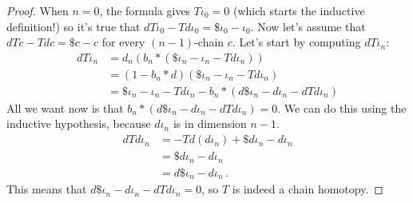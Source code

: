 \begin{proof}
When $n=0$, the formula gives $T\iota_0=0$ (which starts the inductive
definition!) so it's true that $dT\iota_0-Td\iota_0=\$\iota_0-\iota_0$.
Now let's assume that $dTc-Tdc=\$c-c$ for every $(n-1)$-chain $c$. 
Let's start by computing $dT\iota_n$:
\begin{align*}
dT\iota_n & = d_n(b_n\ast(\$\iota_n - \iota_n - Td\iota_n)) \\
& = (1-b_n\ast d)(\$\iota_n - \iota_n - Td\iota_n) \\
& = \$\iota_n-\iota_n-Td\iota_n-b_n\ast (d\$\iota_n - d\iota_n - dTd\iota_n)
\end{align*}
All we want now is that $b_n\ast(d\$\iota_n - d\iota_n - dTd\iota_n)=0$. We can do this using the inductive hypothesis, because $d\iota_n$ is in dimension $n-1$.
\begin{align*}
dTd\iota_n & = -Td(d\iota_n)+\$ d\iota_n - d\iota_n\\
& = \$d\iota_n - d\iota_n\\
& = d\$\iota_n - d\iota_n\,.
\end{align*}
This means that $d\$\iota_n-d\iota_n - dTd\iota_n=0$, so $T$ is indeed a chain homotopy. 
\end{proof}
